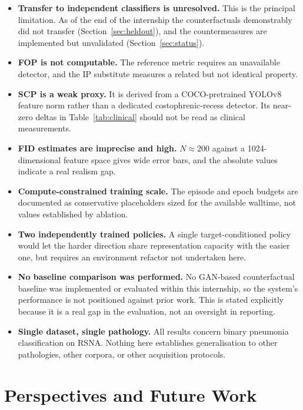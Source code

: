 \begin{itemize}[leftmargin=*]
  \item \textbf{Transfer to independent classifiers is unresolved.} This
        is the principal limitation. As of the end of the internship the
        counterfactuals demonstrably did not transfer
        (Section~\ref{sec:heldout}), and the countermeasures are
        implemented but unvalidated (Section~\ref{sec:status}).
  \item \textbf{FOP is not computable.} The reference metric requires an
        unavailable detector, and the IP substitute measures a related
        but not identical property.
  \item \textbf{SCP is a weak proxy.} It is derived from a COCO-pretrained
        YOLOv8 feature norm rather than a dedicated costophrenic-recess
        detector. Its near-zero deltas in Table~\ref{tab:clinical} should
        not be read as clinical measurements.
  \item \textbf{FID estimates are imprecise and high.} $N \approx 200$
        against a 1024-dimensional feature space gives wide error bars,
        and the absolute values indicate a real realism gap.
  \item \textbf{Compute-constrained training scale.} The episode and
        epoch budgets are documented as conservative placeholders sized
        for the available walltime, not values established by ablation.
  \item \textbf{Two independently trained policies.} A single
        target-conditioned policy would let the harder direction share
        representation capacity with the easier one, but requires an
        environment refactor not undertaken here.
  \item \textbf{No baseline comparison was performed.} No GAN-based
        counterfactual baseline was implemented or evaluated within this
        internship, so the system's performance is not positioned against
        prior work. This is stated explicitly because it is a real gap in
        the evaluation, not an oversight in reporting.
  \item \textbf{Single dataset, single pathology.} All results concern
        binary pneumonia classification on RSNA. Nothing here establishes
        generalisation to other pathologies, other corpora, or other
        acquisition protocols.
\end{itemize}

\section{Perspectives and Future Work}
\label{sec:future}

